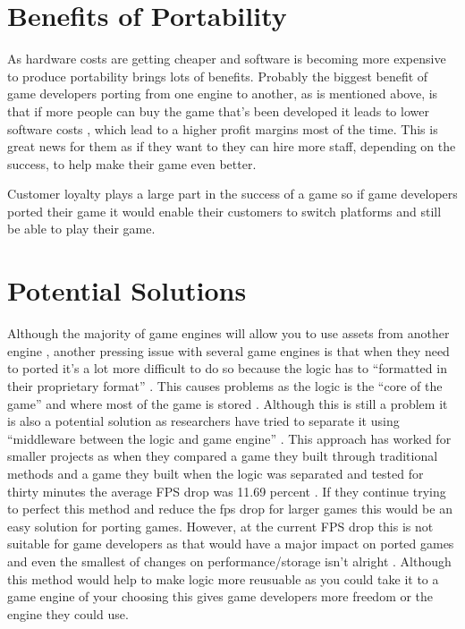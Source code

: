 \documentclass{scrartcl}
\begin{document}
\section{Benefits of Portability}
As hardware costs are getting cheaper and software is becoming more expensive to produce \cite{franz1994code_generation} portability brings lots of benefits. Probably the biggest benefit of game developers porting from one engine to another, as is mentioned above, is that if more people can buy the game that’s been developed it leads to lower software costs \cite{mooney2004developing}, which lead to a higher profit margins most of the time. This is great news for them as if they want to they can hire more staff, depending on the success, to help make their game even better. 

Customer loyalty plays a large part in the success of a game \cite{mooney2004developing} so if game developers ported their game it would enable their customers to switch platforms and still be able to play their game. 


\section{Potential Solutions}
Although the majority of game engines will allow you to use assets from another engine \cite{binsubaih2007g}, another pressing issue with several game engines is that when they need to ported it’s a lot more difficult to do so because the logic has to “formatted in their proprietary format” \cite{binsubaih2005game}\cite{binsubaih2006architecture}. This causes problems as the logic is the “core of the game” and where most of the game is stored \cite{binsubaih2005game}.  Although this is still a problem it is also a potential solution as researchers have tried to separate it using “middleware between the logic and game engine” \cite{binsubaih2005game}. This approach has worked for smaller projects as when they compared a game they built through traditional methods and a game they built when the logic was separated and tested for thirty minutes the average FPS drop was 11.69 percent \cite{binsubaih2008game}. If they continue trying to perfect this method and reduce the fps drop for larger games this would be an easy solution for porting games. However, at the current FPS drop this is not suitable for game developers as that would have a major impact on ported games and even the smallest of changes on performance/storage isn’t alright \cite{mooney2004developing}. Although this method would help to make logic more reusuable as you could take it to a game engine of your choosing \cite{binsubaih2005game} this gives game developers more freedom or the engine they could use. 
\end{document}
